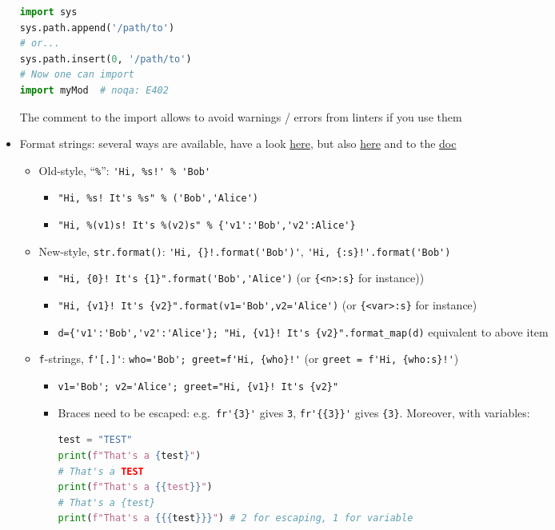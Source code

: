 \documentclass[a4paper,12pt,%
              final%
              ]{article}
\begin{document}
\begin{itemize}
\begin{lstlisting}[language=python]
import sys
sys.path.append('/path/to')
# or...
sys.path.insert(0, '/path/to')
# Now one can import
import myMod  # noqa: E402
\end{lstlisting}
    The comment to the import allows to avoid warnings / errors from linters if you use them
  \item Format strings: several ways are available, have a look \href{https://realpython.com/python-string-formatting/}{here}, but also \href{https://pyformat.info/}{here} and to the \href{https://docs.python.org/3.10/library/string.html#format-string-syntax}{doc}
    \begin{itemize}
      \item Old-style, ``\verb|%|'': \verb|'Hi, %s!' % 'Bob'|
        \begin{itemize}
          \item \verb|"Hi, %s! It's %s" % ('Bob','Alice')|
          \item \verb|"Hi, %(v1)s! It's %(v2)s" % {'v1':'Bob','v2':Alice'}|
        \end{itemize}
      \item New-style, \verb|str.format()|: \verb|'Hi, {}!.format('Bob')'|, \verb|'Hi, {:s}!'.format('Bob')|
        \begin{itemize}
          \item \verb|"Hi, {0}! It's {1}".format('Bob','Alice')| (or \verb|{<n>:s}| for instance))
          \item \verb|"Hi, {v1}! It's {v2}".format(v1='Bob',v2='Alice')| (or \verb|{<var>:s}| for instance)
          \item \verb|d={'v1':'Bob','v2':'Alice'}; "Hi, {v1}! It's {v2}".format_map(d)| equivalent to above item
        \end{itemize}
      \item \texttt{f}-strings, \verb|f'[.]'|: \verb|who='Bob'; greet=f'Hi, {who}!'| (or \verb|greet = f'Hi, {who:s}!'|)
        \begin{itemize}
          \item \verb|v1='Bob'; v2='Alice'; greet="Hi, {v1}! It's {v2}"|
          \item Braces need to be escaped: e.g.\ \verb|fr'{3}'| gives \verb|3|,  \verb|fr'{{3}}'| gives \verb|{3}|. Moreover, with variables:
\begin{lstlisting}[language=python]
test = "TEST"
print(f"That's a {test}")
# That's a TEST
print(f"That's a {{test}}")
# That's a {test}
print(f"That's a {{{test}}}") # 2 for escaping, 1 for variable

\end{lstlisting}
\end{itemize}
\end{itemize}
\end{itemize}
\end{document}
